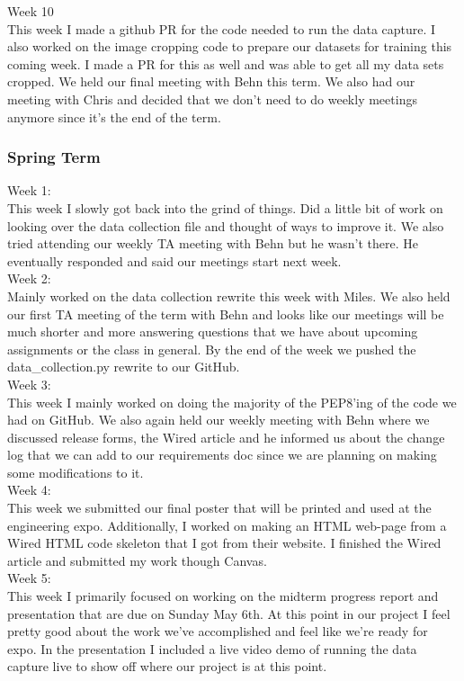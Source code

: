 \documentclass[draftclsnofoot, onecolumn, 10pt, compsoc]{IEEEtran}
\begin{document}
  Week 10 \\
\indent This week I made a github PR for the code needed to run the data capture. I also worked on the image cropping code to prepare our datasets for training this coming week. I made a PR for this as well and was able to get all my data sets cropped. We held our final meeting with Behn this term. We also had our meeting with Chris and decided that we don’t need to do weekly meetings anymore since it's the end of the term.
  
\subsubsection{Spring Term}
    	Week 1: \\ \indent This week I slowly got back into the grind of things. Did a little bit of work on looking over the data collection file and thought of ways to improve it. We also tried attending our weekly TA meeting with Behn but he wasn't there. He eventually responded and said our meetings start next week. \\
    	Week 2: \\ \indent Mainly worked on the data collection rewrite this week with Miles. We also held our first TA meeting of the term with Behn and looks like our meetings will be much shorter and more answering questions that we have about upcoming assignments or the class in general. By the end of the week we pushed the data\_collection.py rewrite to our GitHub. \\
    	Week 3: \\ \indent This week I mainly worked on doing the majority of the PEP8'ing of the code we had on GitHub. We also again held our weekly meeting with Behn where we discussed release forms, the Wired article and he informed us about the change log that we can add to our requirements doc since we are planning on making some modifications to it.  \\
    	Week 4: \\ \indent This week we submitted our final poster that will be printed and used at the engineering expo. Additionally, I worked on making an HTML web-page from a Wired HTML code skeleton that I got from their website. I finished the Wired article and submitted my work though Canvas. \\
    	Week 5: \\ \indent This week I primarily focused on working on the midterm progress report and presentation that are due on Sunday May 6th. At this point in our project I feel pretty good about the work we've accomplished and feel like we're ready for expo. In the presentation I included a live video demo of running the data capture live to show off where our project is at this point.  \\
\end{document}

